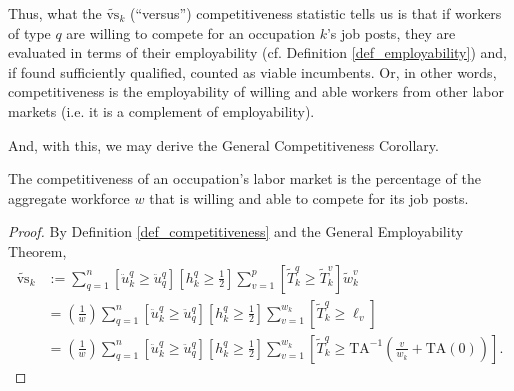 \documentclass[hidelinks, nonatbib]{elsarticle}
\begin{document}
\begin{definition}[Competitiveness]
    Thus, what the $\tilde{\text{vs}}_{k}$ (``versus'') competitiveness statistic tells us is that if workers of type $q$ are willing to compete for an occupation $k$'s job posts, they are evaluated in terms of their employability (cf. Definition \ref{def_employability}) and, if found sufficiently qualified, counted as viable incumbents. Or, in other words, competitiveness is the employability of willing and able workers from other labor markets (i.e. it is a complement of employability).
\end{definition}

And, with this, we may derive the General Competitiveness Corollary.
\begin{corollary}
    \label{gcc}
    The competitiveness of an occupation's labor market is the percentage of the aggregate workforce $w$ that is willing and able to compete for its job posts.

    \begin{proof}
        By Definition \ref{def_competitiveness} and the General Employability Theorem,
        \begin{align}
            \tilde{\text{vs}}_k 
            &:=
            \sum_{q=1}^{n}
            \left[
                \ddot{u}_{k}^{q}
                \geq
                \ddot{u}_{q}^{q}
            \right]
            \left[
                h_{k}^{q}
                \geq
                \frac{1}{2}
            \right]
            \sum_{v=1}^{p}
            \left[
                \tilde{T}_{k}^{q}
                \geq
                \tilde{T}_{k}^{v}
            \right]
            \tilde{w}_{k}^{v}
            \\
            &=
            \left(
                \frac{1}{w}
            \right)
            \sum_{q=1}^{n}
            \left[
                \ddot{u}_{k}^{q}
                \geq
                \ddot{u}_{q}^{q}
            \right]
            \left[
                h_{k}^{q}
                \geq
                \frac{1}{2}
            \right]
            \sum_{v=1}^{w_k}
            \left[
                \tilde{T}_{k}^{q}
                \geq
                \ell_v
            \right]
            \\
            &=
            \left(
                \frac{1}{w}
            \right)
            \sum_{q=1}^{n}
            \left[
                \ddot{u}_{k}^{q}
                \geq
                \ddot{u}_{q}^{q}
            \right]
            \left[
                h_{k}^{q}
                \geq
                \frac{1}{2}
            \right]
            \sum_{v=1}^{w_k}
            \left[
                \tilde{T}_{k}^{q}
                \geq
                \text{TA}^{-1}
                \left(
                    \frac{v}{w_k}
                    +
                    \text{TA}(0)
                \right)
            \right]
            .
        \end{align}
    \end{proof}
\end{corollary}
\end{document}

